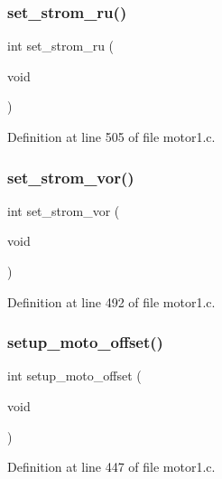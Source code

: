 \mbox{\label{motor1_8c_a751fa601f0d930e5262d7d4a391d327b}} 
\subsubsection{set\+\_\+strom\+\_\+ru()}
{\footnotesize\ttfamily int set\+\_\+strom\+\_\+ru (\begin{DoxyParamCaption}\item[{void}]{ }\end{DoxyParamCaption})}



Definition at line 505 of file motor1.\+c.

\mbox{\label{motor1_8c_a225453e045caff0cf502084e3e8d74d8}} 
\subsubsection{set\+\_\+strom\+\_\+vor()}
{\footnotesize\ttfamily int set\+\_\+strom\+\_\+vor (\begin{DoxyParamCaption}\item[{void}]{ }\end{DoxyParamCaption})}



Definition at line 492 of file motor1.\+c.

\mbox{\label{motor1_8c_a40a1174a35264698604aa308398fc86c}} 
\subsubsection{setup\+\_\+moto\+\_\+offset()}
{\footnotesize\ttfamily int setup\+\_\+moto\+\_\+offset (\begin{DoxyParamCaption}\item[{void}]{ }\end{DoxyParamCaption})}



Definition at line 447 of file motor1.\+c.

\mbox{\label{motor1_8c_ada4960474e4d8468890ef4bf8bb124d1}} 
